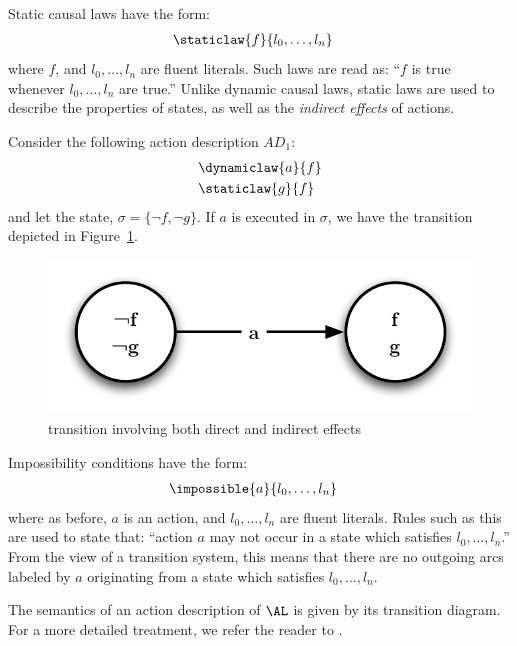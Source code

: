 Static causal laws have the form:
\begin{align*}
    &\staticlaw{f}{l_{0},\ldots,l_{n}}
\end{align*}
where $f$, and $l_{0},\ldots,l_{n}$ are fluent literals. Such laws are read as: ``$f$ is true whenever $l_{0},\ldots,l_{n}$ are true.'' Unlike dynamic causal laws, static laws are used to describe the properties of states, as well as the \emph{indirect effects} of actions.
\begin{example}
{\rm
Consider the following action description $AD_{1}$:
\begin{align*}
    &\dynamiclaw{a}{f} \\
    &\staticlaw{g}{f}
\end{align*}
and let the state, $\sigma = \{\neg{f}, \neg{g}\}$. If $a$ is executed in $\sigma$, we have the transition depicted in Figure~\ref{fig-scl}.
\begin{figure}
    \centering
    \includegraphics[scale=0.5]{static-law}
    \caption{transition involving both direct and indirect effects}
    \label{fig-scl}
\end{figure}
}
\end{example}

Impossibility conditions have the form:
\begin{align*}
    &\impossible{a}{l_{0},\ldots,l_{n}}
\end{align*}
where as before, $a$ is an action, and $l_{0},\ldots,l_{n}$ are fluent literals. Rules such as this are used to state that: ``action $a$ may not occur in a state which satisfies $l_{0},\ldots,l_{n}$.'' From the view of a transition system, this means that there are no outgoing arcs labeled by $a$ originating from a state which satisfies $l_{0},\ldots,l_{n}$.

The semantics of an action description of $\AL$ is given by its transition diagram. For a more detailed treatment, we refer the reader to \cite{Bald2005}.